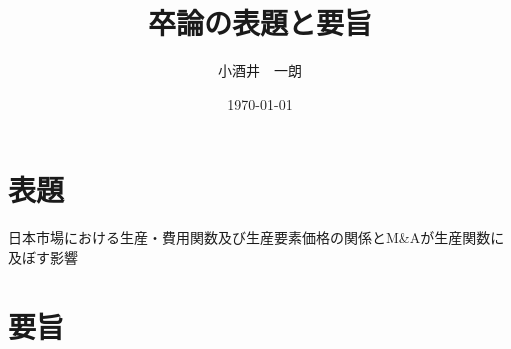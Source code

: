 \documentclass[dvipdfmx,uplatex]{jsarticle}
\title{卒論の表題と要旨}
\author{小酒井　一朗}
\date{\today}
\begin{document}
\maketitle
\section{表題}
日本市場における生産・費用関数及び生産要素価格の関係とM\&Aが生産関数に及ぼす影響

\section{要旨}
\end{document}
